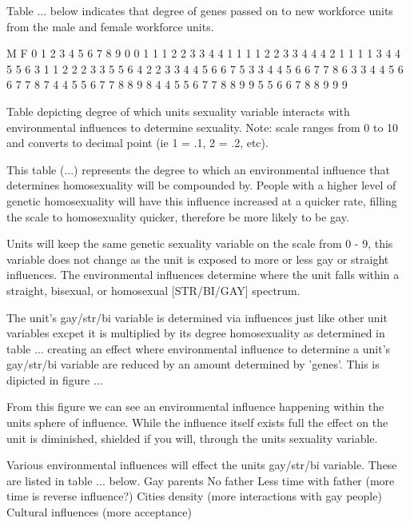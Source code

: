 Table ... below indicates that degree of genes passed on to new workforce units from the male and female workforce units.

   M			        
F  0  1  2  3  4  5  6  7  8  9     
0  0  1  1  1  2  2  3  3  4  4
1  1  1  1  2  2  3  3  4  4  4     
2  1  1  1  1  3  4  4  5  5  6     
3  1  1  2  2  2  3  3  5  5  6     
4  2  2  3  3  4  4  5  6  6  7     
5  3  3  4  4  5  6  6  7  7  8     
6  3  3  4  4  5  6  6  7  7  8     
7  4  4  5  5  6  7  7  8  8  9      
8  4  4  5  5  6  7  7  8  8  9       
9  5  5  6  6  7  8  8  9  9  9

Table depicting degree of which units sexuality variable interacts with environmental influences to determine sexuality.
Note: scale ranges from 0 to 10 and converts to decimal point (ie 1 = .1, 2 = .2, etc).


This table (...) represents the degree to which an environmental influence that determines homosexuality will be compounded by. People with a higher level of genetic homosexuality will have this influence increased at a quicker rate, filling the scale to homosexuality quicker, therefore be more likely to be gay.

Units will keep the same genetic sexuality variable on the scale from 0 - 9, this variable does not change as the unit is exposed to more or less gay or straight influences. The environmental influences determine where the unit falls within a straight, bisexual, or homosexual [STR/BI/GAY] spectrum.

The unit's gay/str/bi variable is determined via influences just like other unit variables excpet it is multiplied by its degree homosexuality as determined in table ... creating an effect where environmental influence to determine a unit's gay/str/bi variable are reduced by an amount determined by 'genes'. This is dipicted in figure ...


From this figure we can see an environmental influence happening within the units sphere of influence. While the influence itself exists full the effect on the unit is diminished, shielded if you will, through the units sexuality variable. 

Various environmental influences will effect the units gay/str/bi variable. These are listed in table ... below.
Gay parents
No father
Less time with father (more time is reverse influence?)
Cities density (more interactions with gay people)
Cultural influences (more acceptance)





